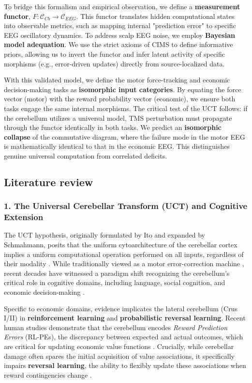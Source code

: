 \documentclass{article}
\begin{document}
	To bridge this formalism and empirical observation, we define a \textbf{measurement functor}, $F: \mathcal{C}_{Cb} \to \mathcal{C}_{EEG}$. This functor translates hidden computational states into observable metrics, such as mapping internal "prediction error" to specific EEG oscillatory dynamics. To address scalp EEG noise, we employ \textbf{Bayesian model adequation}. We use the strict axioms of CIMS to define informative priors, allowing us to invert the functor and infer latent activity of specific morphisms (e.g., error-driven updates) directly from source-localized data.
	
	With this validated model, we define the motor force-tracking and economic decision-making tasks as \textbf{isomorphic input categories}. By equating the force vector (motor) with the reward probability vector (economic), we ensure both tasks engage the same internal morphisms. The critical test of the UCT follows: if the cerebellum utilizes a universal model, TMS perturbation must propagate through the functor identically in both tasks. We predict an \textbf{isomorphic collapse} of the commutative diagram, where the failure mode in the motor EEG is mathematically identical to that in the economic EEG. This distinguishes genuine universal computation from correlated deficits.
	
	\subsection{Literature review}
	
	\subsubsection*{1. The Universal Cerebellar Transform (UCT) and Cognitive Extension}
	The UCT hypothesis, originally formulated by Ito and expanded by Schmahmann, posits that the uniform cytoarchitecture of the cerebellar cortex implies a uniform computational operation performed on all inputs, regardless of their modality \parencite{itoMovementThoughtIdentical1993, schmahmannDysmetriaThoughtClinical1998}. While traditionally viewed as a motor error-correction machine \parencite{ecclesCerebellumNeuronalMachine1967}, recent decades have witnessed a paradigm shift recognizing the cerebellum's critical role in cognitive domains, including language, social cognition, and economic decision-making \parencite{koziolConsensusPaperCerebellums2014}.
	
	Specific to economic domains, evidence implicates the lateral cerebellum (Crus I/II) in \textbf{reinforcement learning} and \textbf{probabilistic reversal learning}. Recent human studies demonstrate that the cerebellum encodes \textit{Reward Prediction Errors} (RL-PEs), the discrepancy between expected and actual outcomes, which are critical for updating economic value functions \parencite{huvermannCerebellumContributesPrediction2025}. Crucially, while cerebellar damage often spares the initial acquisition of value associations, it specifically impairs \textbf{reversal learning}, the ability to flexibly update these associations when reward contingencies change \parencite{thomaCerebellumInvolvedRewardbased2008}.
	
\end{document}
